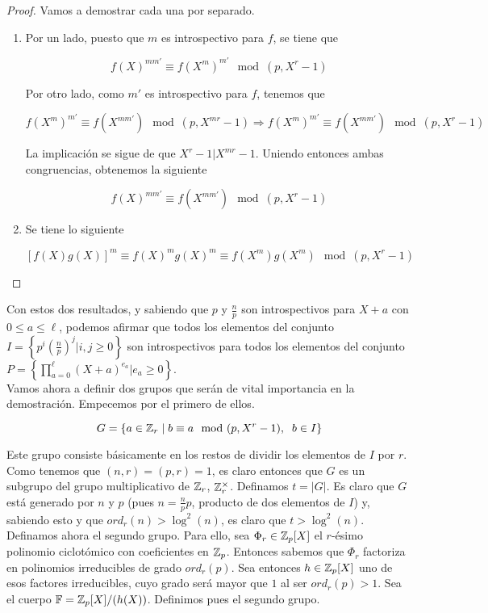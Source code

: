 \begin{proof}
	Vamos a demostrar cada una por separado.
	
	\begin{enumerate}
		\item Por un lado, puesto que $m$ es introspectivo para $f$, se tiene que
		
		\[ f(X)^{mm'} \equiv f(X^m)^{m'} \mod(p, X^r - 1) \]
		
		Por otro lado, como $m'$ es introspectivo para $f$, tenemos que
		
		\[ f(X^m)^{m'} \equiv f(X^{mm'}) \mod(p, X^{mr} - 1) \Rightarrow f(X^m)^{m'} \equiv f(X^{mm'}) \mod(p, X^r - 1) \]
		
		La implicación se sigue de que $X^r - 1 | X^{mr} - 1$. Uniendo entonces ambas congruencias, obtenemos la siguiente
		
		\[ f(X)^{mm'} \equiv f(X^{mm'}) \mod(p, X^r - 1) \]
		
		\item Se tiene lo siguiente
		
		\[ \left[f(X)g(X)\right]^m \equiv f(X)^mg(X)^m \equiv f(X^m)g(X^m) \mod(p, X^r - 1) \]
	\end{enumerate}
\end{proof}

Con estos dos resultados, y sabiendo que $p$ y $\frac{n}{p}$ son introspectivos para $X + a$ con $0 \leq a \leq \ell$, podemos afirmar que todos los elementos del conjunto $I = \left\{ p^i\left(\frac{n}{p}\right)^j | i, j \geq 0 \right\}$ son introspectivos para todos los elementos del conjunto $P = \left\{ \prod_{a=0}^{\ell}(X + a)^{e_a} | e_a \geq 0 \right\}$.\\

Vamos ahora a definir dos grupos que serán de vital importancia en la demostración. Empecemos por el primero de ellos.

\[ G = \left\{ a \in \mathbb{Z}_r \mid b \equiv a \mod(p, X^r - 1),\;\;b \in I \right\} \]

Este grupo consiste básicamente en los restos de dividir los elementos de $I$ por $r$. Como tenemos que $(n, r) = (p, r) = 1$, es claro entonces que $G$ es un subgrupo del grupo multiplicativo de $\mathbb{Z}_r$, $\mathbb{Z}_r^\times$. Definamos $t = |G|$. Es claro que $G$ está generado por $n$ y $p$ (pues $n = \frac{n}{p}p$, producto de dos elementos de $I$) y, sabiendo esto y que $ord_r(n) > \log^2(n)$, es claro que $t > \log^2(n)$.\\

Definamos ahora el segundo grupo. Para ello, sea $\Phi_r \in \mathbb{Z}_p[X]$ el $r$-ésimo polinomio ciclotómico con coeficientes en $\mathbb{Z}_p$. Entonces sabemos que $\Phi_r$ factoriza en polinomios irreducibles de grado $ord_r(p)$. Sea entonces $h \in \mathbb{Z}_p[X]$ uno de esos factores irreducibles, cuyo grado será mayor que $1$ al ser $ord_r(p) > 1$. Sea el cuerpo $\mathbb{F} = \mathbb{Z}_p[X]/(h(X))$. Definimos pues el segundo grupo.

